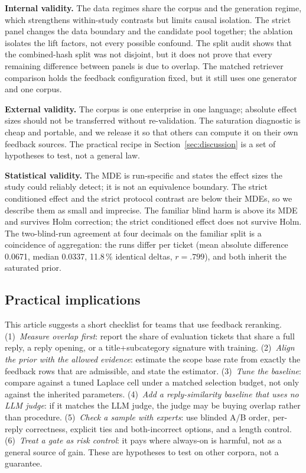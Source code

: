\textbf{Internal validity.} The data regimes share the corpus and the generation
regime, which strengthens within-study contrasts but limits causal isolation. The
strict panel changes the data boundary and the candidate pool together; the
ablation isolates the lift factors, not every possible confound. The split audit
shows that the combined-hash split was not disjoint, but it does not prove
that every remaining difference between panels is due to overlap. The matched
retriever comparison holds the feedback configuration fixed, but it still uses one
generator and one corpus.

\textbf{External validity.} The corpus is one enterprise in one language; absolute
effect sizes should not be transferred without re-validation. The saturation
diagnostic is cheap and portable, and we release it so that others can compute it
on their own feedback sources. The practical recipe in Section~\ref{sec:discussion}
is a set of hypotheses to test, not a general law.

\textbf{Statistical validity.} The MDE is run-specific and states the effect sizes
the study could reliably detect; it is not an equivalence boundary. The strict
conditioned effect and the strict protocol contrast are below their MDEs, so we
describe them as small and imprecise. The familiar blind harm is above its MDE and
survives Holm correction; the strict conditioned effect does not survive Holm. The
two-blind-run agreement at four decimals on the familiar split is a coincidence
of aggregation: the runs differ per ticket (mean absolute difference 0.0671,
median 0.0337, 11.8\,\% identical deltas, $r=.799$), and both inherit the saturated
prior.

\subsection{Practical implications}
This article suggests a short checklist for teams that use feedback reranking.
(1)~\emph{Measure overlap first}: report the share of evaluation tickets that share
a full reply, a reply opening, or a title+subcategory signature with training.
(2)~\emph{Align the prior with the allowed evidence}: estimate the scope base rate
from exactly the feedback rows that are admissible, and state the estimator.
(3)~\emph{Tune the baseline}: compare against a tuned Laplace cell under a matched
selection budget, not only against the inherited parameters. (4)~\emph{Add a reply-similarity baseline that uses no LLM judge}: if it matches the LLM judge, the judge may be buying
overlap rather than procedure. (5)~\emph{Check a sample with experts}: use blinded
A/B order, per-reply correctness, explicit ties and both-incorrect options, and a
length control. (6)~\emph{Treat a gate as risk control}: it pays where always-on is
harmful, not as a general source of gain. These are hypotheses to test on other
corpora, not a guarantee.
